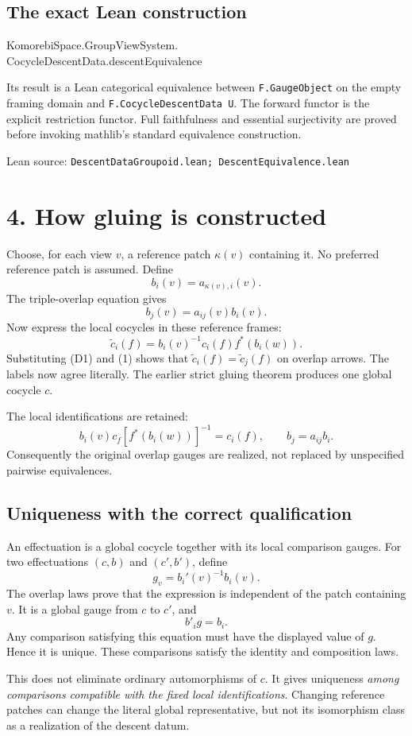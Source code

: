 \documentclass[11pt]{article}
\newcommand{\source}[1]{\par{\footnotesize\textsf{Lean source:} \texttt{#1}}\par}
\begin{document}
\subsection*{The exact Lean construction}
{\small\ttfamily\raggedright
KomorebiSpace.GroupViewSystem.\\
CocycleDescentData.descentEquivalence\par}
Its result is a Lean categorical equivalence between \texttt{F.GaugeObject} on the empty framing domain and \texttt{F.CocycleDescentData U}. The forward functor is the explicit restriction functor. Full faithfulness and essential surjectivity are proved before invoking mathlib's standard equivalence construction.
\source{DescentDataGroupoid.lean; DescentEquivalence.lean}

\clearpage
\section*{4. How gluing is constructed}
Choose, for each view $v$, a reference patch $\kappa(v)$ containing it. No preferred reference patch is assumed. Define
\[
b_i(v)=a_{\kappa(v),i}(v).
\]
The triple-overlap equation gives
\[
b_j(v)=a_{ij}(v)b_i(v).
\tag{1}
\]
Now express the local cocycles in these reference frames:
\[
\widetilde c_i(f)=b_i(v)^{-1}c_i(f)f^*(b_i(w)).
\tag{2}
\]
Substituting (D1) and (1) shows that $\widetilde c_i(f)=\widetilde c_j(f)$ on overlap arrows. The labels now agree literally. The earlier strict gluing theorem produces one global cocycle $c$.

The local identifications are retained:
\[
\boxed{b_i(v)c_f[f^*(b_i(w))]^{-1}=c_i(f),\qquad b_j=a_{ij}b_i.}
\]
Consequently the original overlap gauges are realized, not replaced by unspecified pairwise equivalences.

\subsection*{Uniqueness with the correct qualification}
An effectuation is a global cocycle together with its local comparison gauges. For two effectuations $(c,b)$ and $(c',b')$, define
\[
\boxed{g_v=b_i'(v)^{-1}b_i(v).}
\]
The overlap laws prove that the expression is independent of the patch containing $v$. It is a global gauge from $c$ to $c'$, and
\[
b'_ig=b_i.
\]
Any comparison satisfying this equation must have the displayed value of $g$. Hence it is unique. These comparisons satisfy the identity and composition laws.

This does not eliminate ordinary automorphisms of $c$. It gives uniqueness \emph{among comparisons compatible with the fixed local identifications}. Changing reference patches can change the literal global representative, but not its isomorphism class as a realization of the descent datum.
\end{document}
